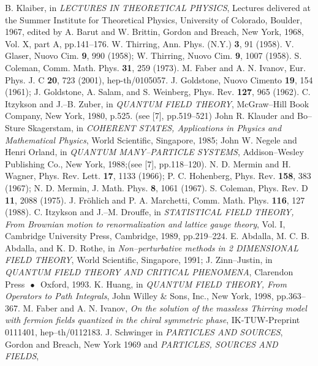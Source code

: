 \documentclass[a4paper,12pt] {article}
\begin{document}
\begin{thebibliography}{9}
\bibitem{[1]}
B. Klaiber, 
in {\it LECTURES IN THEORETICAL PHYSICS},
Lectures delivered at the Summer Institute for Theoretical Physics,
University of Colorado, Boulder, 1967, edited by A. Barut and
W. Brittin, Gordon and Breach, New York, 1968, Vol. X, 
part A, pp.141--176.
\bibitem{[2]}
W. Thirring, 
Ann. Phys. (N.Y.) {\bf 3}, 91 (1958).
\bibitem{[3]}
V. Glaser,
Nuovo Cim. {\bf 9}, 990 (1958);
W. Thirring,
Nuovo Cim. {\bf 9}, 1007 (1958).
\bibitem{[4]}
S. Coleman,
Comm. Math. Phys. {\bf 31}, 259 (1973).
\bibitem{[5]}
M. Faber and A. N. Ivanov,
Eur. Phys. J. C {\bf 20}, 723 (2001), hep-th/0105057.
\bibitem{[6]}
J. Goldstone,
Nuovo Cimento {\bf 19}, 154 (1961);
J. Goldstone, A. Salam, and S. Weinberg,
Phys. Rev. {\bf 127}, 965 (1962). 
\bibitem{[7]}
C. Itzykson and J.--B. Zuber,
in {\it QUANTUM FIELD THEORY}, McGraw--Hill Book Company, 
New York, 1980, p.525.
\bibitem{[8]}
(see [7], pp.519--521)
\bibitem{[9]}
John R. Klauder and Bo--Sture Skagerstam,
in {\it COHERENT STATES, Applications in Physics 
and Mathematical Physics}, World Scientific, Singapore, 1985;
John W. Negele and Henri Orland, 
in {\it QUANTUM MANY--PARTICLE SYSTEMS}, 
Addison--Wesley Publishing Co., New York, 1988;(see [7], pp.118--120).
\bibitem{[10]} 
N. D. Mermin and H. Wagner, 
Phys. Rev. Lett. {\bf 17},
1133 (1966);
P. C. Hohenberg,
Phys. Rev. {\bf 158}, 383 (1967);
N. D. Mermin,
J. Math. Phys. {\bf 8}, 1061 (1967).
\bibitem{[11]}
S. Coleman,
Phys. Rev. D {\bf 11}, 2088 (1975).
\bibitem{[12]}
J. Fr\"ohlich and P. A. Marchetti,
Comm. Math. Phys. {\bf 116}, 127 (1988).
\bibitem{[13]}
C. Itzykson and J.--M. Drouffe,
in {\it STATISTICAL FIELD THEORY, From Brownian motion to 
renormalization and lattice gauge theory}, Vol. I, Cambridge 
University Press, Cambridge, 1989, pp.219--224.
\bibitem{[14]}
E. Abdalla, M. C. B. Abdalla, and K. D. Rothe,
in {\it Non--perturbative methods in 2 DIMENSIONAL FIELD THEORY},
World Scientific, Singapore, 1991;
J. Zinn--Justin,
in {\it QUANTUM FIELD THEORY AND CRITICAL PHENOMENA},
Clarendon Press $\,\bullet\,$ Oxford, 1993.
\bibitem{[15]}
K. Huang,
in {\it QUANTUM FIELD THEORY, From Operators to Path Integrals}, 
John Willey $\&$ Sons, Inc., New York, 1998, pp.363--367.
\bibitem{[16]}
M. Faber and A. N. Ivanov,
{\it On the solution of the massless
Thirring model  with fermion
fields quantized in the chiral symmetric phase},
IK-TUW-Preprint 0111401, hep--th/0112183.
\bibitem{[17]} 
J. Schwinger 
in {\it PARTICLES AND SOURCES}, Gordon and
Breach, New York 1969 and 
{\it PARTICLES, SOURCES AND FIELDS},

\end{thebibliography}
\end{document}
